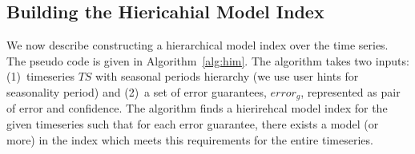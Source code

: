 \documentclass[10pt,conference,letterpaper]{IEEEtran}
\newcommand{\LN}{hierarchical model index}
\newcommand{\LNs}{hierarchical model index }
\begin{document}
 \subsection{Building the Hiericahial Model Index}
We now describe constructing a \LNs over the time series. The pseudo code is given in Algorithm~\ref{alg:him}. The algorithm takes two inputs: (1)~timeseries $TS$ with seasonal periods hierarchy (we use user hints for seasonality period) and (2)~a set of error guarantees, $error_g$, represented as pair of error and confidence. 
The algorithm finds a hierirehcal model index for the given timeseries such that for each error guarantee, there exists a model (or more) in the index which meets this requirements for the entire timeseries.
\end{document}
